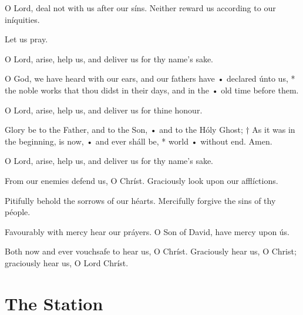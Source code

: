 \V O Lord, deal not with us after our síns.  \R Neither reward us according to our iníquities.

\centerline{Let us pray.}



\ant O Lord, arise, help us, and deliver us for thy name’s sake.

\V O God, we have heard with our ears, and our fathers have • declared únto us, * the noble works that thou didst in their days, and in the • old time before them.

\ant O Lord, arise, help us, and deliver us for thine honour.

\V Glory be to the Father, and to the Son, • and to the Hóly Ghost; † As it was in the beginning, is now, • and ever sháll be, * world • without end. Amen.

\ant O Lord, arise, help us, and deliver us for thy name’s sake.


\V From our enemies defend us, O Chríst.  \R Graciously look upon our afflíctions.

\V Pitifully behold the sorrows of our héarts.  \R Mercifully forgive the sins of thy péople.

\V Favourably with mercy hear our práyers.  \R O Son of David, have mercy upon ús.

\V Both now and ever vouchsafe to hear us, O Chríst.  \R Graciously hear us, O Christ; graciously hear us, O Lord Chríst.


\section{The Station}
\label{litanyStation}

